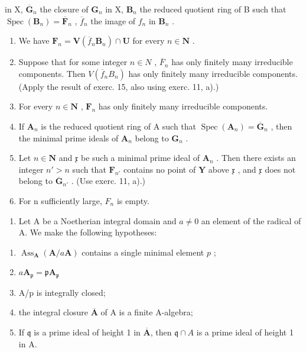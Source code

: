 in X, \(\overline{\mathbf{G}}_n\) the closure of \(\mathbf{G}_n\) in X, \(\mathbf{B}_n\) the reduced quotient ring of B such that \(\operatorname{Spec}(\mathbf{B}_n) = \overline{\mathbf{F}}_n\) , \(\overline{f}_n\) the image of \(f_n\) in \(\mathbf{B}_n\) .

\begin{enumerate}
\def\labelenumi{\alph{enumi})}
\item
  We have \(\mathbf{F}_n = \mathbf{V}(\overline{f}_n\mathbf{B}_n)\cap \mathbf{U}\) for every \(n\in \mathbf{N}\) .
\item
  Suppose that for some integer \(n \in N\) , \(\overline{F}_{n}\) has only finitely many irreducible components. Then \(V(\overline{f}_{n}B_{n})\) has only finitely many irreducible components. (Apply the result of exerc. 15, also using exerc. 11, a).)
\item
  For every \(n\in\mathbf{N}\) , \(\mathbf{F}_{n}\) has only finitely many irreducible components.
\item
  If \(\mathbf{A}_n\) is the reduced quotient ring of A such that \(\operatorname{Spec}(\mathbf{A}_n) = \overline{\mathbf{G}}_n\) , then the minimal prime ideals of \(\mathbf{A}_n\) belong to \(\mathbf{G}_n\) .
\item
  Let \(n \in \mathbf{N}\) and \(\mathfrak{x}\) be such a minimal prime ideal of \(\mathbf{A}_n\) . Then there exists an integer \(n' > n\) such that \(\mathbf{F}_{n'}\) contains no point of \(\mathbf{Y}\) above \(\mathfrak{x}\) , and \(\mathfrak{x}\) does not belong to \(\overline{\mathbf{G}}_{n'}\) . (Use exerc. 11, a).)
\item
  For n sufficiently large, \(F_{n}\) is empty.
\end{enumerate}

\begin{enumerate}
\def\labelenumi{\arabic{enumi})}
\setcounter{enumi}{16}
\tightlist
\item
  Let A be a Noetherian integral domain and \(a \neq 0\) an element of the radical of A. We make the following hypotheses:
\end{enumerate}

\begin{enumerate}
\def\labelenumi{(\roman{enumi})}
\item
  \(\operatorname{Ass}_{\mathbf{A}}(\mathbf{A} / a\mathbf{A})\) contains a single minimal element \(p\) ;
\item
  \(a\mathbf{A}_{\mathfrak{p}} = \mathfrak{p}\mathbf{A}_{\mathfrak{p}}\)
\item
  A/p is integrally closed;
\item
  the integral closure \(\overline{\mathbf{A}}\) of A is a finite A-algebra;
\item
  If \(\mathfrak{q}\) is a prime ideal of height 1 in \(\overline{\mathbf{A}}\), then \(\mathfrak{q} \cap A\) is a prime ideal of height 1 in A.
\end{enumerate}

